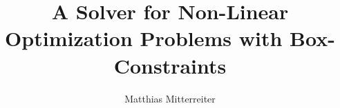 \documentclass[11pt, oneside]{report}
\title{A Solver for Non-Linear Optimization Problems with Box-Constraints}
\author{Matthias Mitterreiter}
\begin{document}
\begin{titlingpage}
	\maketitle
	
\end{titlingpage}
\tableofcontents



{\footnotesize 
}
\end{document}
